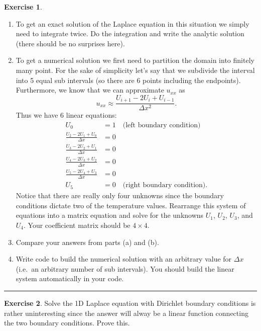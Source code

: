 \documentclass[
]{book}
\providecommand{\tightlist}{%
  \setlength{\itemsep}{0pt}\setlength{\parskip}{0pt}}
\theoremstyle{definition}
\theoremstyle{definition}
\theoremstyle{definition}
\newtheorem{exercise}{Exercise}[chapter]
\theoremstyle{remark}
\begin{document}
\begin{exercise}
\begin{enumerate}
\def\labelenumi{\alph{enumi}.}
\tightlist
\item
  To get an exact solution of the Laplace equation in this situation we simply need to integrate twice. Do the integration and write the analytic solution (there should be no surprises here).
\item
  To get a numerical solution we first need to partition the domain into finitely many point. For the sake of simplicity let's say that we subdivide the interval into 5 equal sub intervals (so there are 6 points including the endpoints). Furthermore, we know that we can approximate \(u_{xx}\) as
  \[ u_{xx} \approx \frac{U_{i+1} - 2U_i + U_{i-1}}{\Delta x^2}. \]
  Thus we have 6 linear equations:
  \[\begin{aligned}
  U_0 &= 1 \quad \text{(left boundary condition)}\\
  \frac{U_2 - 2U_1 + U_0}{\Delta x} &= 0 \\ 
  \frac{U_3 - 2U_2 + U_1}{\Delta x} &= 0 \\ 
  \frac{U_4 - 2U_3 + U_2}{\Delta x} &= 0 \\ 
  \frac{U_5 - 2U_4 + U_3}{\Delta x} &= 0 \\ 
  U_5 &= 0 \quad \text{(right boundary condition).}
  \end{aligned}\]
  Notice that there are really only four unknowns since the boundary conditions dictate two of the temperature values. Rearrange this system of equations into a matrix equation and solve for the unknowns \(U_1\), \(U_2\), \(U_3\), and \(U_4\). Your coefficient matrix should be \(4 \times 4\).
\item
  Compare your answers from parts (a) and (b).
\item
  Write code to build the numerical solution with an arbitrary value for \(\Delta x\) (i.e.~an arbitrary number of sub intervals). You should build the linear system automatically in your code.
\end{enumerate}
\end{exercise}

\begin{center}\rule{0.5\linewidth}{0.5pt}\end{center}

\begin{exercise}
\protect\hypertarget{exr:unnamed-chunk-599}{}{\label{exr:unnamed-chunk-599} }Solve the 1D Laplace equation with Dirichlet boundary conditions is rather uninteresting since the answer will alway be a linear function connecting the two boundary conditions. Prove this.
\end{exercise}
\end{document}
